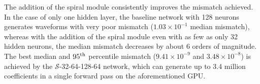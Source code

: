 \documentclass[preprint,12pt]{elsarticle}
\begin{document}
The addition of the spiral module consistently improves the mismatch achieved. In the case of only one hidden layer, the baseline network with 128 neurons generates waveforms with very poor mismatch ($1.03 \times 10^{-1}$ median mismatch), whereas with the addition of the spiral module even with as few as only 32 hidden neurons, the median mismatch decreases by about 6 orders of magnitude. The best median and $95^{\rm th}$ percentile mismatch ($9.41 \times 10^{-9}$ and $3.48 \times 10^{-8}$) is achieved by the $\mathcal{S}$-32-64-128-64 network, which can generate up to 3.4 million coefficients in a single forward pass on the aforementioned GPU.

\begin{table}[]
    \centering
\end{table}
\end{document}
